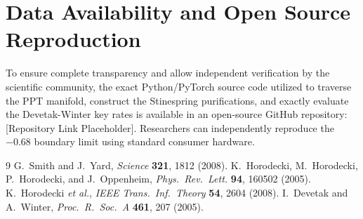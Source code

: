 \documentclass[twocolumn,prl,aps,superscriptaddress,floatfix]{revtex4-2}
\begin{document}
\section{Data Availability and Open Source Reproduction}
To ensure complete transparency and allow independent verification by the scientific community, the exact Python/PyTorch source code utilized to traverse the PPT manifold, construct the Stinespring purifications, and exactly evaluate the Devetak-Winter key rates is available in an open-source GitHub repository: [Repository Link Placeholder]. Researchers can independently reproduce the $-0.68$ boundary limit using standard consumer hardware.

\begin{thebibliography}{9}
 G.~Smith and J.~Yard, \emph{Science} \textbf{321}, 1812 (2008).
 K.~Horodecki, M.~Horodecki, P.~Horodecki, and J.~Oppenheim, \emph{Phys.\ Rev.\ Lett.} \textbf{94}, 160502 (2005).
 K.~Horodecki \emph{et al.}, \emph{IEEE Trans.\ Inf.\ Theory} \textbf{54}, 2604 (2008).
 I.~Devetak and A.~Winter, \emph{Proc.\ R.\ Soc.\ A} \textbf{461}, 207 (2005).
\end{thebibliography}
\end{document}
